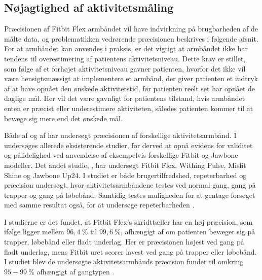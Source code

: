 \subsection{Nøjagtighed af aktivitetsmåling}

Præcisionen af Fitbit Flex armbåndet vil have indvirkning på brugbarheden af de målte data, og problematikken vedrørende præcisionen beskrives i følgende afsnit. For at armbåndet kan anvendes i praksis, er det vigtigt at armbåndet ikke har tendens til overestimering af patientens aktivitetsniveau. Dette krav er stillet, som følge af et forhøjet aktivitetsniveau gavner patienten, hvorfor det ikke vil være hensigtsmæssigt at implementere et armbånd, der giver patienten et indtryk af at have opnået den ønskede aktivitetstid, før patienten reelt set har opnået de daglige mål. Her vil det være gavnligt for patientens tilstand, hvis armbåndet enten er præcist eller underestimere aktiviteten, således patienten kommer til at bevæge sig mere end det ønskede mål.

Både  af \citeauthor{evenson2015} og  af \citeauthor{kaewkannate2016} har undersøgt præcisionen af forskellige aktivitetsarmbånd. I \citeauthor{evenson2015} undersøges allerede eksisterende studier, for derved at opnå evidens for validitet og pålidelighed ved anvendelse af eksempelvis forskellige Fitbit og Jawbone modeller. Det andet studie, \citeauthor{kaewkannate2016}, har undersøgt Fitbit Flex, Withing Pulse, Misfit Shine og Jawbone Up$24$. I studiet er både brugertilfredshed, repeterbarhed og præcision undersøgt, hvor aktivitetsarmbåndene testes ved normal gang, gang på trapper og gang på løbebånd. Samtidig testes muligheden for at gentage forsøget med samme resultat også, for at undersøge repeterbarheden \citep{evenson2015, kaewkannate2016}.

I studierne er det fundet, at Fitbit Flex's skridttæller har en høj præcision, som ifølge \citeauthor{kaewkannate2016} ligger mellem $96,4~\%$ til $99,6~\%$, afhængigt af om patienten bevæger sig på trapper, løbebånd eller fladt underlag. Her er præcisionen højest ved gang på fladt underlag, mens Fitbit uret scorer lavest ved gang på trapper eller løbebånd. I studiet blev de undersøgte aktivitetsarmbånds præcision fundet til omkring $95-99~\%$ afhængigt af gangtypen \citep{kaewkannate2016}.

